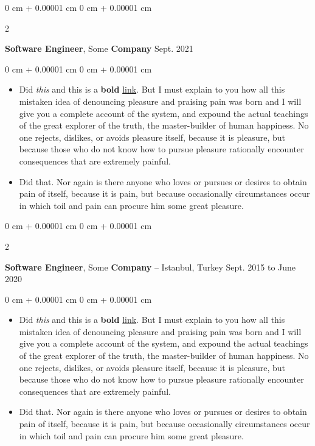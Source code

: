 \documentclass[10pt, letterpaper]{article}
\newenvironment{highlights}{
    \begin{itemize}[
        topsep=0.10 cm,
        parsep=0.10 cm,
        partopsep=0pt,
        itemsep=0pt,
        leftmargin=0 cm + 10pt
    ]
}{
    \end{itemize}
} %
\newenvironment{onecolentry}{
    \begin{adjustwidth}{
        0 cm + 0.00001 cm
    }{
        0 cm + 0.00001 cm
    }
}{
    \end{adjustwidth}
} %
\newenvironment{twocolentry}[2][]{
    \onecolentry
    \def\secondColumn{#2}
    \setcolumnwidth{\fill, 4.5 cm}
    \begin{paracol}{2}
}{
    \switchcolumn \raggedleft \secondColumn
    \end{paracol}
    \endonecolentry
} %
\begin{document}
        \vspace{0.2 cm}

        \begin{twocolentry}{
            Sept. 2021
        }
            \textbf{Software Engineer}, Some \textbf{Company}\end{twocolentry}

        \vspace{0.10 cm}
        \begin{onecolentry}
            \begin{highlights}
                \item Did \textit{this} and this is a \textbf{bold} \href{https://example.com}{link}. But I must explain to you how all this mistaken idea of denouncing pleasure and praising pain was born and I will give you a complete account of the system, and expound the actual teachings of the great explorer of the truth, the master-builder of human happiness. No one rejects, dislikes, or avoids pleasure itself, because it is pleasure, but because those who do not know how to pursue pleasure rationally encounter consequences that are extremely painful.
                \item Did that. Nor again is there anyone who loves or pursues or desires to obtain pain of itself, because it is pain, but because occasionally circumstances occur in which toil and pain can procure him some great pleasure.
            \end{highlights}
        \end{onecolentry}


        \vspace{0.2 cm}

        \begin{twocolentry}{
            Sept. 2015 to June 2020
        }
            \textbf{Software Engineer}, Some \textbf{Company} -- Istanbul, Turkey\end{twocolentry}

        \vspace{0.10 cm}
        \begin{onecolentry}
            \begin{highlights}
                \item Did \textit{this} and this is a \textbf{bold} \href{https://example.com}{link}. But I must explain to you how all this mistaken idea of denouncing pleasure and praising pain was born and I will give you a complete account of the system, and expound the actual teachings of the great explorer of the truth, the master-builder of human happiness. No one rejects, dislikes, or avoids pleasure itself, because it is pleasure, but because those who do not know how to pursue pleasure rationally encounter consequences that are extremely painful.
                \item Did that. Nor again is there anyone who loves or pursues or desires to obtain pain of itself, because it is pain, but because occasionally circumstances occur in which toil and pain can procure him some great pleasure.
            \end{highlights}
        \end{onecolentry}
\end{document}
